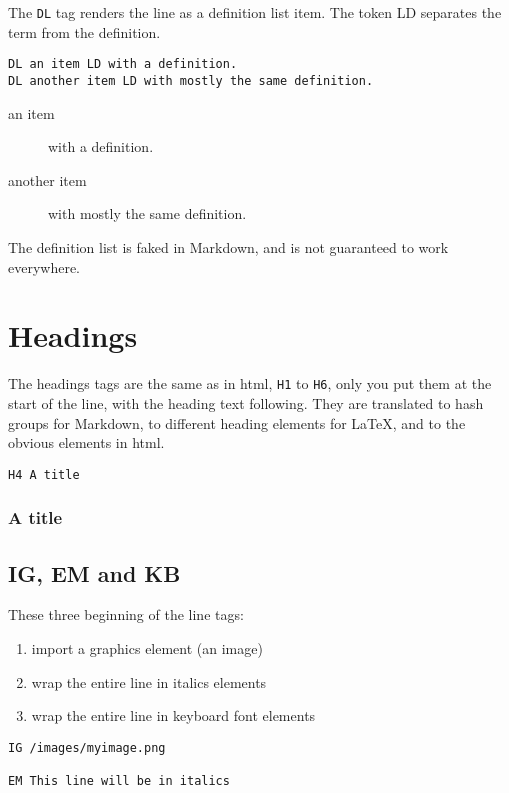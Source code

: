 The \texttt{DL} tag renders the line as a definition list item. The token LD separates the term from the definition.

\begin{verbatim}
DL an item LD with a definition.
DL another item LD with mostly the same definition.
\end{verbatim}
\begin{description}
\item[an item] with a definition.
\item[another item] with mostly the same definition.
\end{description}

The definition list is faked in Markdown, and is not guaranteed to work everywhere.

\chapter{Headings}
\label{headings}

The headings tags are the same as in html, \texttt{H1} to \texttt{H6}, only you put them at the start of the line, with the heading text following. They are translated to hash groups for Markdown, to different heading elements for \LaTeX{}, and to the obvious elements in html.

\begin{verbatim}
H4 A title
\end{verbatim}
\subsection{A title}
\label{a-title}
\section{IG, EM and KB}
\label{ig-em-and-kb}

These three beginning of the line tags:

\begin{enumerate}
\item  import a graphics element (an image)
\item  wrap the entire line in italics elements
\item  wrap the entire line in keyboard font elements
\end{enumerate}
\begin{verbatim}
IG /images/myimage.png

EM This line will be in italics
\end{verbatim}

